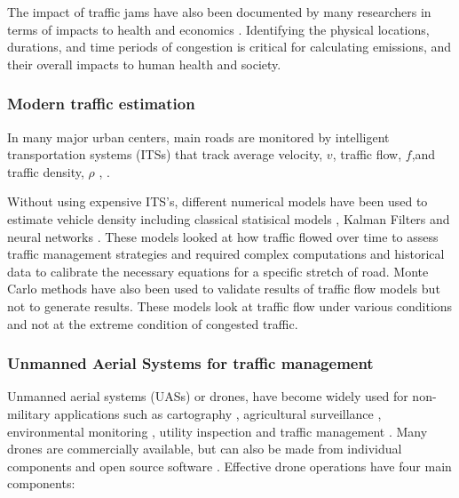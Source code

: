 \documentclass[preprint,12pt,a4paper,authoryear]{elsarticle}
\begin{document}
\begin{linenumbers}
The impact of traffic jams have also been documented by many researchers in terms of impacts to health \citep{Zhang2013, Zhang2011, Levy2010} and economics \citep{Cebr2014}.  Identifying the physical locations, durations, and time periods of congestion is critical for calculating emissions, and their overall impacts to human health and society.

\subsubsection{Modern traffic estimation}

In many major urban centers, main roads are monitored by intelligent transportation systems (ITSs) that track average velocity, $v$, traffic flow, $f$,and traffic density, $\rho$ \citep{Wu2007}, \citep{Bartosz2015}.

Without using expensive ITS's, different numerical models have been used to estimate vehicle density including classical statisical models \citep{Schreckenberg1995}, Kalman Filters \citep{Pourmoallem1997, Sun2004} and neural networks \citep{Ghosh-Dastidar2006}.  These models looked at how traffic flowed over time to assess traffic management strategies and required complex computations and historical data to calibrate the necessary equations for a specific stretch of road.  Monte Carlo methods have also been used to validate results of traffic flow models \citep{Mihaylova2004} but not to generate results.  These models look at traffic flow under various conditions and not at the extreme condition of congested traffic. 

\subsubsection{Unmanned Aerial Systems for traffic management} 
Unmanned aerial systems (UASs) or drones, have become widely used for non-military applications such as cartography \citep{Saadatseresht2015}, agricultural surveillance \citep{Saari2017}, environmental monitoring \citep{Capolupo2015}, utility inspection \citep{Day2017, Gomez2017} and traffic management \citep{Salvo2017, Liu2013}. Many drones are commercially available, but can also be made from individual components and open source software \citep{Sharma2016a}.  Effective drone operations have four main components:


\end{linenumbers}
\end{document}
